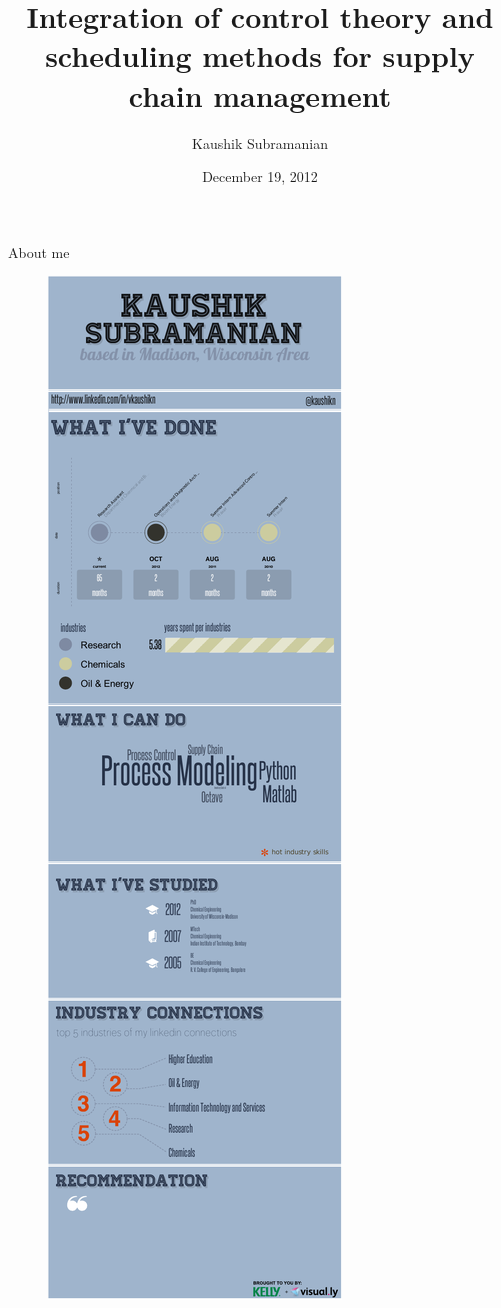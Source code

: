 \documentclass[table]{beamer}
\title[Cooperative MPC]{Integration of control theory and scheduling
  methods for supply chain management}
\author[Kaushik Subramanian]{Kaushik Subramanian}
\institute[UW-Madison]{
\begin{minipage}{0.4\textwidth}
\centering
Department of\\Chemical and Biological Engineering\\[1ex]
\pgfuseimage{uw-logo}
\end{minipage}
}
\date{December 19, 2012}
\begin{document}
{\NoHeaderFooter
 \begin{frame}{}
  \titlepage
 \end{frame}
}

{\NoHeaderFooter
 \begin{frame}{About me}
   \begin{figure}
    \includegraphics{education.pdf}

\end{figure}
\end{frame}}
\end{document}
